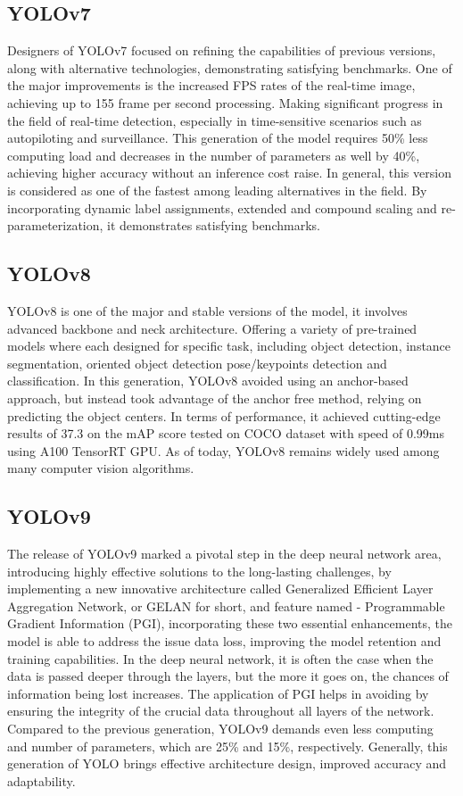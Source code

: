 \begin{multicols}{2}
\subsection{YOLOv7}
Designers of YOLOv7 focused on refining the capabilities of previous versions, along with alternative technologies, demonstrating satisfying benchmarks. One of the major improvements is the increased FPS rates of the real-time image, achieving up to 155 frame per second processing. Making significant progress in the field of real-time detection, especially in time-sensitive scenarios such as autopiloting and surveillance. This generation of the model requires 50\% less computing load and decreases in the number of parameters as well by 40\%, achieving higher accuracy without an inference cost raise. In general, this version is considered as one of the fastest among leading alternatives in the field. By incorporating dynamic label assignments, extended and compound scaling and re-parameterization, it demonstrates satisfying benchmarks.

\subsection{YOLOv8}
YOLOv8 is one of the major and stable versions of the model, it involves advanced backbone and neck architecture. Offering a variety of pre-trained models where each designed for specific task, including object detection, instance segmentation, oriented object detection pose/keypoints detection and classification. In this generation, YOLOv8 avoided using an anchor-based approach, but instead took advantage of the anchor free method, relying on predicting the object centers. In terms of performance, it achieved cutting-edge results of 37.3 on the mAP score tested on COCO dataset with speed of 0.99ms using A100 TensorRT GPU. As of today, YOLOv8 remains widely used among many computer vision algorithms.

\subsection{YOLOv9}
The release of YOLOv9 marked a pivotal step in the deep neural network area, introducing highly effective solutions to the long-lasting challenges, by implementing a new innovative architecture called Generalized Efficient Layer Aggregation Network, or GELAN for short, and feature named - Programmable Gradient Information (PGI), incorporating these two essential enhancements, the model is able to address the issue data loss, improving the model retention and training capabilities. In the deep neural network, it is often the case when the data is passed deeper through the layers, but the more it goes on, the chances of information being lost increases. The application of PGI helps in avoiding by ensuring the integrity of the crucial data throughout all layers of the network. Compared to the previous generation, YOLOv9 demands even less computing and number of parameters, which are 25\% and 15\%, respectively. Generally, this generation of YOLO brings effective architecture design, improved accuracy and adaptability.


\end{multicols}
